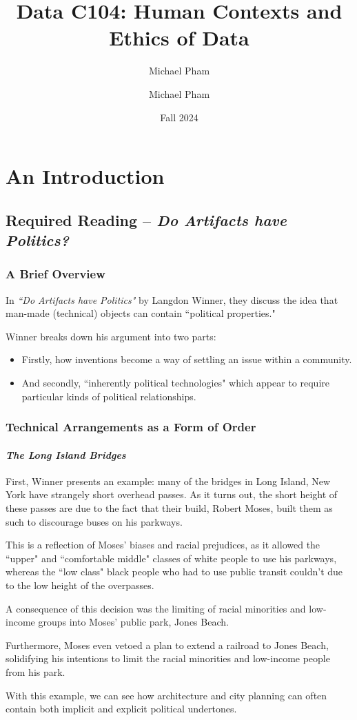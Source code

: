 \documentclass[openany]{book}
\title{#1}
\author{Michael Pham}
\date{#2}
\renewcommand{\mytitle}[2]{%
	\title{#1}
	\author{Michael Pham}
	\date{#2}
	\maketitle
	\newpage
	\mytoc
	\newpage
}
\begin{document}
\mytitle{Data C104: Human Contexts and Ethics of Data}{Fall 2024}

\chapter{An Introduction}
\section{Required Reading -- \textit{Do Artifacts have Politics?}}
\subsection{A Brief Overview}
In \textit{``Do Artifacts have Politics"} by Langdon Winner, they discuss the idea that man-made (technical) objects can contain ``political properties."

Winner breaks down his argument into two parts:
\begin{itemize}
	\item Firstly, how inventions become a way of settling an issue within a community.
	\item And secondly, ``inherently political technologies" which appear to require particular kinds of political relationships.
\end{itemize}

\subsection{Technical Arrangements as a Form of Order}
\subsubsection{\textit{The Long Island Bridges}}
\begin{example}
	First, Winner presents an example: many of the bridges in Long Island, New York have strangely short overhead passes. As it turns out, the short height of these passes are due to the fact that their build, Robert Moses, built them as such to discourage buses on his parkways.

	This is a reflection of Moses' biases and racial prejudices, as it allowed the ``upper" and ``comfortable middle" classes of white people to use his parkways, whereas the ``low class" black people who had to use public transit couldn't due to the low height of the overpasses.
	
	A consequence of this decision was the limiting of racial minorities and low-income groups into Moses' public park, Jones Beach.
	
	Furthermore, Moses even vetoed a plan to extend a railroad to Jones Beach, solidifying his intentions to limit the racial minorities and low-income people from his park.
	
	With this example, we can see how architecture and city planning can often contain both implicit and explicit political undertones.
\end{example}
\end{document}
